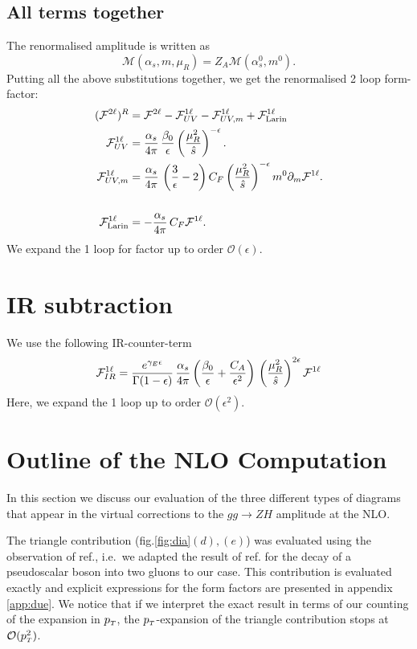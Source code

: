 \subsection{All terms together }
The renormalised amplitude is written as
\begin{equation}
	\mathcal M  (\alpha_s, m, \mu_R) = Z_A \mathcal M( \alpha_s^0, m^0).
\end{equation}
Putting all the above substitutions together, we get the renormalised  2 loop form-factor:
\begin{align}
	( \mathcal F ^{2 \ell})^R &= 	\mathcal F ^{2 \ell} -	\mathcal F_{UV} ^{1 \ell}- 	\mathcal F_{UV, m} ^{1 \ell} + \mathcal F_{\text{Larin}} ^{1 \ell}   \\
	\mathcal F_{UV} ^{1 \ell} &= \frac{\alpha_s}{4 \pi}\,\frac{\beta_0}{\epsilon} \left( \frac{\mu_R^2}{\hat s} \right) ^{ -\epsilon}.  \nonumber \\
	\mathcal F_{UV, m} ^{1 \ell} &= \frac{\alpha_s}{4 \pi} \, \left( \frac{3}{\epsilon} -2\right) C_F \left( \frac{\mu_R^2}{\hat s} \right) ^{ -\epsilon} m^0 \partial_m \mathcal F ^{1 \ell} . \nonumber \\
	\\
	\mathcal	F_{\text{Larin}} ^{1 \ell}  &= - \frac{\alpha_s}{4 \pi} \, C_F  \mathcal F ^{1 \ell} .\nonumber
\end{align}
We expand the 1 loop for factor up to order $ \mathcal O(\epsilon) $.
\section{ IR subtraction}
We use the following IR-counter-term
\begin{equation}
	\mathcal F_{IR} ^{1 \ell}  = \frac{e^{\gamma_E \epsilon}}{\Gamma(1-\epsilon)} \, \frac{\alpha_s}{4 \pi} \left( \frac{\beta_0}{\epsilon} + \frac{ C_A}{\epsilon^2} \right)  \, \left(  \frac{\mu_R^2}{\hat s}\right) ^{2\epsilon} \mathcal F ^{1 \ell}
\end{equation}
Here, we expand the 1 loop up to order $ \mathcal O(\epsilon^2) $.
\section{Outline of the NLO Computation}
\label{sec:quattro}
In this section we discuss our evaluation of the three different types of
diagrams that appear in the virtual corrections to the $gg \to ZH$ amplitude
at the NLO.

The triangle contribution (fig.\ref{fig:dia}$(d),(e)$) was evaluated using the
observation of  ref.\cite{Altenkamp:2012sx}, i.e.~we adapted
the result of ref.\cite{Aglietti:2006tp} for the decay of a
pseudoscalar boson into two gluons  to our case. This contribution is evaluated
exactly and explicit expressions for the form factors are presented in
appendix \ref{app:due}. We notice that if we interpret the exact result
in terms of our counting of the expansion in $p_{\scriptscriptstyle T}$, the $p_{\scriptscriptstyle T}$-expansion of the triangle contribution stops at ${\cal O}(p_{\scriptscriptstyle T}^2)$.


